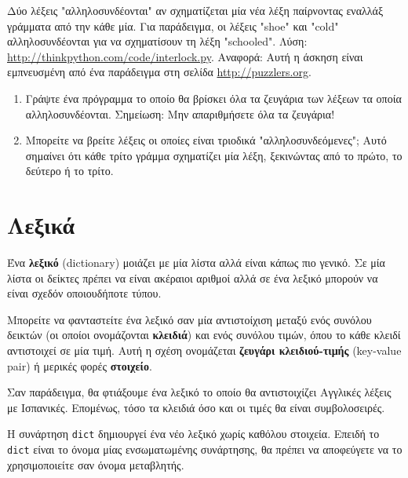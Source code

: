 \documentclass[10pt]{book}
\begin{document}
\begin{exercise}

Δύο λέξεις "αλληλοσυνδέονται" αν σχηματίζεται μία νέα λέξη παίρνοντας εναλλάξ γράμματα από την κάθε μία. Για παράδειγμα, οι λέξεις "shoe" και "cold" αλληλοσυνδέονται για να σχηματίσουν τη λέξη "schooled". Λύση: \url{http://thinkpython.com/code/interlock.py}. Αναφορά:  Αυτή η άσκηση είναι εμπνευσμένη από ένα παράδειγμα στη σελίδα  \url{http://puzzlers.org}.

\begin{enumerate}

\item  Γράψτε ένα πρόγραμμα το οποίο θα βρίσκει όλα τα ζευγάρια των λέξεων τα οποία  αλληλοσυνδέονται. Σημείωση: Μην απαριθμήσετε όλα τα ζευγάρια!

\item  Μπορείτε να βρείτε λέξεις οι οποίες είναι τριοδικά "αλληλοσυνδεόμενες"; Αυτό σημαίνει ότι κάθε τρίτο γράμμα σχηματίζει μία λέξη, ξεκινώντας από το πρώτο, το δεύτερο ή το τρίτο.

\end{enumerate}

\end{exercise}

 
\chapter{Λεξικά}

Ένα {\bf λεξικό} (dictionary) μοιάζει με μία λίστα αλλά είναι κάπως πιο γενικό. Σε μία λίστα οι δείκτες πρέπει να είναι ακέραιοι αριθμοί αλλά σε ένα λεξικό μπορούν να είναι σχεδόν οποιουδήποτε τύπου.

Μπορείτε να φανταστείτε ένα λεξικό σαν μία αντιστοίχιση μεταξύ ενός συνόλου δεικτών (οι οποίοι ονομάζονται {\bf κλειδιά}) και ενός συνόλου τιμών, όπου το κάθε κλειδί αντιστοιχεί σε μία τιμή. Αυτή η σχέση ονομάζεται {\bf ζευγάρι κλειδιού-τιμής} (key-value pair) ή μερικές φορές {\bf στοιχείο}. 

Σαν παράδειγμα, θα φτιάξουμε ένα λεξικό το οποίο θα αντιστοιχίζει Αγγλικές λέξεις με Ισπανικές. Επομένως, τόσο τα κλειδιά όσο και οι τιμές θα είναι συμβολοσειρές.

Η συνάρτηση {\tt dict} δημιουργεί ένα νέο λεξικό χωρίς καθόλου στοιχεία. Επειδή το {\tt dict} είναι το όνομα μίας ενσωματωμένης συνάρτησης, θα πρέπει να αποφεύγετε να το χρησιμοποιείτε σαν όνομα μεταβλητής.
 
\end{document}
